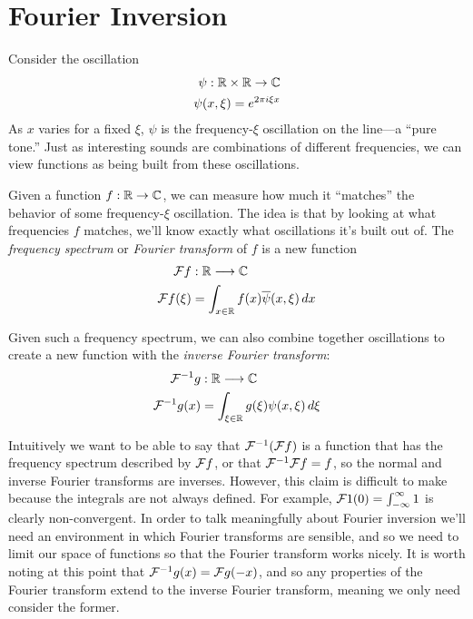 
  \chapter{Fourier Inversion}

    Consider the oscillation
    \begin{align*}
      \psi:\mathbb{R}\times\mathbb{R}\rightarrow\mathbb{C}\\
      \psi(x,\xi) = e^{2\pi i \xi x}
    \end{align*}
    As $x$ varies for a fixed $\xi$, $\psi$ is the frequency-$\xi$ oscillation on the line---a ``pure tone.''
    Just as interesting sounds are combinations of different frequencies, we can view functions as being built from these oscillations. 

    Given a function $f:\mathbb{R}\rightarrow\mathbb{C}$, we can measure how much it ``matches'' the behavior of some frequency-$\xi$ oscillation.
    The idea is that by looking at what frequencies $f$ matches, we'll know exactly what oscillations it's built out of.
    The \emph{frequency spectrum} or \emph{Fourier transform} of $f$ is a new function 
    \begin{align*}
      \mathcal{F} f&:\mathbb{R}\longrightarrow\mathbb{C}\\
      \mathcal{F} f(\xi) &= \int_{x\in\mathbb{R}} f(x)\overline\psi(x,\xi)\,dx
    \end{align*}

    Given such a frequency spectrum, we can also combine together oscillations to create a new function with the \emph{inverse Fourier transform}:
    \begin{align*}
      \mathcal{F}^{-1}g&:\mathbb{R}\longrightarrow\mathbb{C}\\
      \mathcal{F}^{-1}g(x) &= \int_{\xi\in\mathbb{R}} g(\xi)\psi(x,\xi)\,d\xi
    \end{align*}

    Intuitively we want to be able to say that $\mathcal{F}^{-1}(\mathcal{F} f)$ is a function that has the frequency spectrum described by $\mathcal{F} f$, or that $\mathcal{F}^{-1}\mathcal{F} f = f$, so the normal and inverse Fourier transforms are inverses.
    However, this claim is difficult to make because the integrals are not always defined.
    For example, $\mathcal{F}1(0)=\int_{-\infty}^\infty1$ is clearly non-convergent.
    In order to talk meaningfully about Fourier inversion we'll need an environment in which Fourier transforms are sensible, and so we need to limit our space of functions so that the Fourier transform works nicely.
    It is worth noting at this point that $\mathcal{F}^{-1}g(x) = \mathcal{F} g(-x)$, and so any properties of the Fourier transform extend to the inverse Fourier transform, meaning we only need consider the former.

